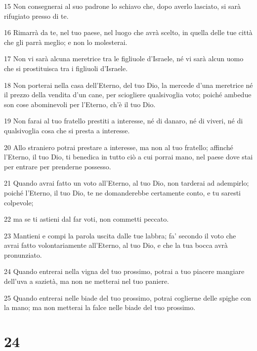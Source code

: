 \par 15 Non consegnerai al suo padrone lo schiavo che, dopo averlo lasciato, si sarà rifugiato presso di te.
\par 16 Rimarrà da te, nel tuo paese, nel luogo che avrà scelto, in quella delle tue città che gli parrà meglio; e non lo molesterai.
\par 17 Non vi sarà alcuna meretrice tra le figliuole d'Israele, né vi sarà alcun uomo che si prostituisca tra i figliuoli d'Israele.
\par 18 Non porterai nella casa dell'Eterno, del tuo Dio, la mercede d'una meretrice né il prezzo della vendita d'un cane, per sciogliere qualsivoglia voto; poiché ambedue son cose abominevoli per l'Eterno, ch'è il tuo Dio.
\par 19 Non farai al tuo fratello prestiti a interesse, né di danaro, né di viveri, né di qualsivoglia cosa che si presta a interesse.
\par 20 Allo straniero potrai prestare a interesse, ma non al tuo fratello; affinché l'Eterno, il tuo Dio, ti benedica in tutto ciò a cui porrai mano, nel paese dove stai per entrare per prenderne possesso.
\par 21 Quando avrai fatto un voto all'Eterno, al tuo Dio, non tarderai ad adempirlo; poiché l'Eterno, il tuo Dio, te ne domanderebbe certamente conto, e tu saresti colpevole;
\par 22 ma se ti astieni dal far voti, non commetti peccato.
\par 23 Mantieni e compi la parola uscita dalle tue labbra; fa' secondo il voto che avrai fatto volontariamente all'Eterno, al tuo Dio, e che la tua bocca avrà pronunziato.
\par 24 Quando entrerai nella vigna del tuo prossimo, potrai a tuo piacere mangiare dell'uva a sazietà, ma non ne metterai nel tuo paniere.
\par 25 Quando entrerai nelle biade del tuo prossimo, potrai coglierne delle spighe con la mano; ma non metterai la falce nelle biade del tuo prossimo.

\chapter{24}

